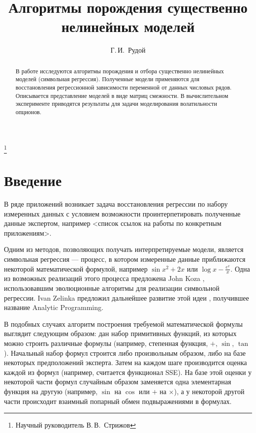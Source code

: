 \documentclass[12pt,a4paper]{amsart}
\begin{document}
\pagestyle{plain}

\title{Алгоритмы порождения существенно нелинейных моделей}
\author{Г.\,И.~Рудой}
\address{Московский физико-технический институт, ФУПМ, каф. <<Интеллектуальные системы>>}
\thanks{Научный руководитель В.\,В.~Стрижов}

\begin{abstract}
  В работе исследуются алгоритмы порождения и отбора существенно нелинейных
  моделей (символьная регрессия). Полученные модели применяются для
  восстановления регрессионной зависимости переменной от данных числовых
  рядов. Описывается представление моделей в виде матриц смежности. В
  вычислительном эксперименте приводятся результаты для задачи моделирования
  волатильности опционов.
\end{abstract}

\maketitle

\section{Введение}

В ряде приложений возникает задача восстановления регрессии по набору
измеренных данных с условием возможности проинтерпетировать полученные данные
экспертом, например <список ссылок на работы по конкретным приложениям>.

Одним из методов, позволяющих получать интерпретируемые модели, является
символьная регрессия --- процесс, в котором измеренные данные приближаются
некоторой математической формулой, например $ \sin x^2 + 2x $ или
$\log x - \frac{e^x}{x} $. Одна из возможных реализаций этого процесса
предложена John Koza \cite{Koza1998GP} \cite{Koza1998Intro}, использовавшим
эволюционные алгоритмы для реализации символьной регрессии. Ivan Zelinka
предложил дальнейшее развитие этой идеи \cite{Zelinka2008}, получившее
название Analytic Programming.

В подобных случаях алгоритм построения требуемой математической формулы
выглядит следующим образом: дан набор примитивных функций, из которых можно
строить различные формулы (например, степенная функция, $+$, $\sin$, $\tan$).
Начальный набор формул строится либо произвольным образом, либо на базе
некоторых предположений эксперта. Затем на каждом шаге производится оценка
каждой из формул (например, считается функционал SSE). На базе этой оценки
у некоторой части формул случайным образом заменяется одна элементарная
функция на другую (например, $\sin$ на $\cos$ или $+$ на $\times$), а у некоторой
другой части происходит взаимный попарный обмен подвыражениями в формулах.
\end{document}
